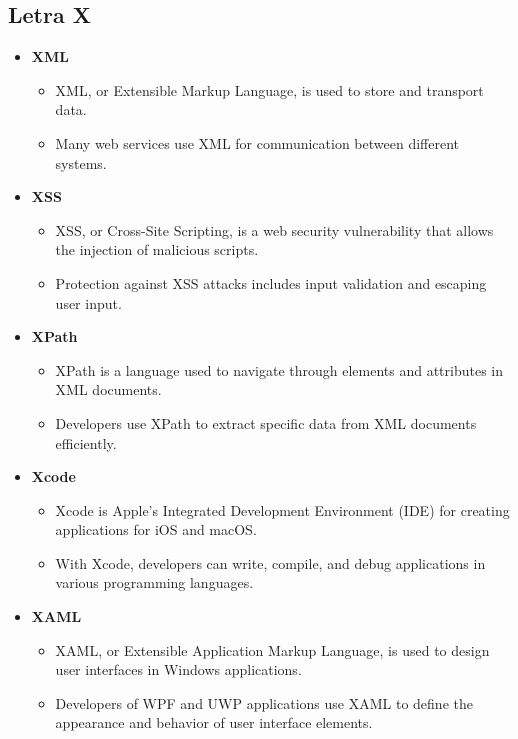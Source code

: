     \subsection{Letra X}
    \begin{itemize}
        \item \textbf{XML}
        \begin{itemize}
            \item XML, or Extensible Markup Language, is used to store and transport data.
            \item Many web services use XML for communication between different systems.
        \end{itemize}
        \item \textbf{XSS}
        \begin{itemize}
            \item XSS, or Cross-Site Scripting, is a web security vulnerability that allows the injection of malicious scripts.
            \item Protection against XSS attacks includes input validation and escaping user input.
        \end{itemize}
        \item \textbf{XPath}
        \begin{itemize}
            \item XPath is a language used to navigate through elements and attributes in XML documents.
            \item Developers use XPath to extract specific data from XML documents efficiently.
        \end{itemize}
        \item \textbf{Xcode}
        \begin{itemize}
            \item Xcode is Apple's Integrated Development Environment (IDE) for creating applications for iOS and macOS.
            \item With Xcode, developers can write, compile, and debug applications in various programming languages.
        \end{itemize}
        \item \textbf{XAML}
        \begin{itemize}
            \item XAML, or Extensible Application Markup Language, is used to design user interfaces in Windows applications.
            \item Developers of WPF and UWP applications use XAML to define the appearance and behavior of user interface elements.
        \end{itemize}
    \end{itemize}
